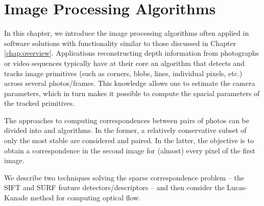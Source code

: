 
\chapter{Image Processing Algorithms}
\label{chap:algorithms}

In this chapter, we introduce the image processing algorithms often applied in software solutions with functionality similar to those discussed in Chapter \ref{chap:overview}. 
Applications reconstructing depth information from photographs or video sequences typically have at their core an algorithm that detects and tracks image primitives (such as corners, blobs, lines, individual pixels, etc.) across several photos/frames. 
This knowledge allows one to estimate the camera parameters, which in turn makes it possible to compute the spacial parameters of the tracked primitives.

The approaches to computing correspondences between pairs of photos can be divided into  and  algorithms. 
In the former, a relatively conservative subset of only the most stable  are considered and paired. 
In the latter, the objective is to obtain a correspondence in the second image for (almost) every pixel of the first image. 

We describe two techniques solving the sparse correspondence problem -- the SIFT \cite{lowe1999} and SURF \cite{surf2006} feature detectors/descriptors -- and then consider the Lucas-Kanade method for computing optical flow. %

